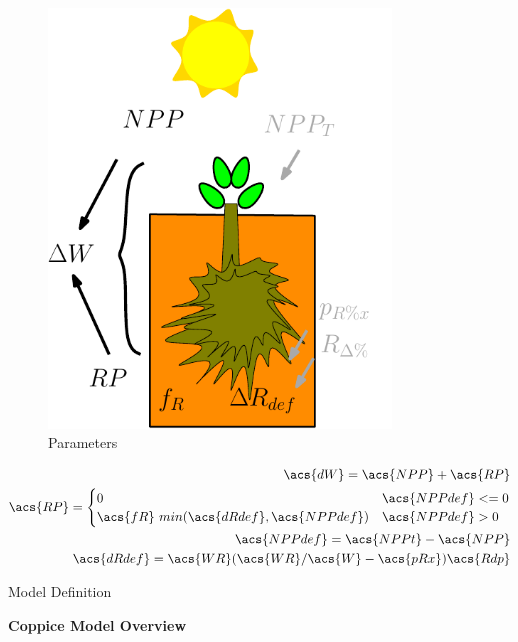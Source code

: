 \documentclass[10pt]{article}
\begin{document}
\begin{figure}[!ht]
  \centering
\begin{subfigure}[b]{.2\linewidth}
  \includegraphics[width=1.0\linewidth]{img/tree_pics_10}
  \caption{Parameters}
  \label{fig:coppice-img}
\end{subfigure}
\quad
\begin{subtable}[b]{.75\linewidth}
\begin{align}
\acs{dW}=\acs{NPP}+\acs{RP} \\
\acs{RP} = \begin{cases} 0 & \acs{NPPdef} <=0 \\
\acs{fR} ~ min (\acs{dRdef} ,\acs{NPPdef}) & \acs{NPPdef} > 0  
\end{cases} \\
\acs{NPPdef} = \acs{NPPt}-\acs{NPP} \\
\acs{dRdef} = \acs{WR}(\acs{WR}/\acs{W} - \acs{pRx})\acs{Rdp}
\end{align}
\caption{Model Definition}
\end{subtable}
\caption{\textbf{Coppice Model Overview}}
  \label{fig:coppice}
\end{figure}
\end{document}
